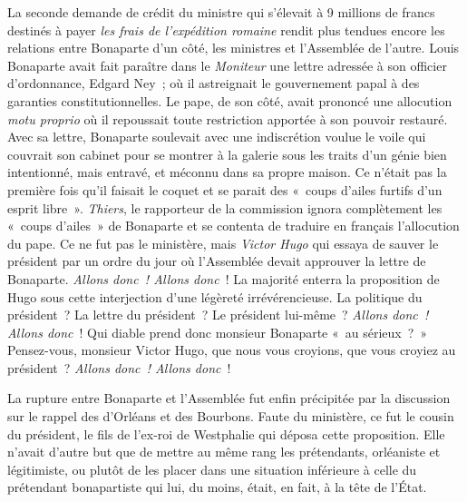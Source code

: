 \documentclass[french,twoside]{book} %
\begin{document}
La seconde demande de crédit du ministre qui s’élevait à 9 millions de francs destinés à payer \emph{les frais de l’expédition romaine} rendit plus tendues encore les relations entre Bonaparte d’un côté, les ministres et l’Assemblée de l’autre. Louis Bonaparte avait fait paraître dans le \emph{Moniteur} une lettre adressée à son officier d’ordonnance, Edgard Ney ; où il astreignait le gouvernement papal à des garanties constitutionnelles. Le pape, de son côté, avait prononcé une allocution \emph{motu proprio} où il repoussait toute restriction apportée à son pouvoir restauré. Avec sa lettre, Bonaparte soulevait avec une indiscrétion voulue le voile qui couvrait son cabinet pour se montrer à la galerie sous les traits d’un génie bien intentionné, mais entravé, et méconnu dans sa propre maison. Ce n’était pas la première fois qu’il faisait le coquet et se parait des « coups d’ailes furtifs d’un esprit libre ». \emph{Thiers}, le rapporteur de la commission ignora complètement les « coups d’ailes » de Bonaparte et se contenta de traduire en français l’allocution du pape. Ce ne fut pas le ministère, mais \emph{Victor Hugo} qui essaya de sauver le président par un ordre du jour où l’Assemblée devait approuver la lettre de Bonaparte. \emph{Allons donc ! Allons donc} ! La majorité enterra la proposition de Hugo sous cette interjection d’une légèreté irrévérencieuse. La politique du président ? La lettre du président ? Le président lui-même ? \emph{Allons donc ! Allons donc} ! Qui diable prend donc monsieur Bonaparte « au sérieux ? » Pensez-vous, monsieur Victor Hugo, que nous vous croyions, que vous croyiez au président ? \emph{Allons donc ! Allons donc} !\par
La rupture entre Bonaparte et l’Assemblée fut enfin précipitée par la discussion sur le rappel des d’Orléans et des Bourbons. Faute du ministère, ce fut le cousin du président, le fils de l’ex-roi de Westphalie qui déposa cette proposition. Elle n’avait d’autre but que de mettre au même rang les prétendants, orléaniste et légitimiste, ou plutôt de les placer dans une situation inférieure à celle du prétendant bonapartiste qui lui, du moins, était, en fait, à la tête de l’État.\par
\end{document}
